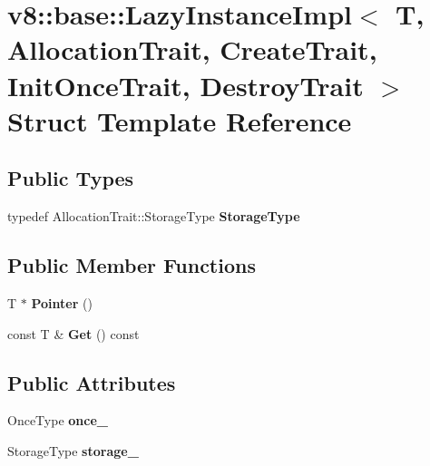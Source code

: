 \hypertarget{structv8_1_1base_1_1_lazy_instance_impl}{}\section{v8\+:\+:base\+:\+:Lazy\+Instance\+Impl$<$ T, Allocation\+Trait, Create\+Trait, Init\+Once\+Trait, Destroy\+Trait $>$ Struct Template Reference}
\label{structv8_1_1base_1_1_lazy_instance_impl}
\subsection*{Public Types}
\begin{DoxyCompactItemize}
\item 
typedef Allocation\+Trait\+::\+Storage\+Type {\bfseries Storage\+Type}\hypertarget{structv8_1_1base_1_1_lazy_instance_impl_a932ebac30855580c8ae22feb343b4b97}{}\label{structv8_1_1base_1_1_lazy_instance_impl_a932ebac30855580c8ae22feb343b4b97}

\end{DoxyCompactItemize}
\subsection*{Public Member Functions}
\begin{DoxyCompactItemize}
\item 
T $\ast$ {\bfseries Pointer} ()\hypertarget{structv8_1_1base_1_1_lazy_instance_impl_a731d414ae2f2f0fafb4df47502b21068}{}\label{structv8_1_1base_1_1_lazy_instance_impl_a731d414ae2f2f0fafb4df47502b21068}

\item 
const T \& {\bfseries Get} () const \hypertarget{structv8_1_1base_1_1_lazy_instance_impl_a18c32c8d47cfc7014b0bbbe8192f23f1}{}\label{structv8_1_1base_1_1_lazy_instance_impl_a18c32c8d47cfc7014b0bbbe8192f23f1}

\end{DoxyCompactItemize}
\subsection*{Public Attributes}
\begin{DoxyCompactItemize}
\item 
Once\+Type {\bfseries once\+\_\+}\hypertarget{structv8_1_1base_1_1_lazy_instance_impl_afb03ba68ffaf3610be2c2f021cc5faf5}{}\label{structv8_1_1base_1_1_lazy_instance_impl_afb03ba68ffaf3610be2c2f021cc5faf5}

\item 
Storage\+Type {\bfseries storage\+\_\+}\hypertarget{structv8_1_1base_1_1_lazy_instance_impl_a0fb34dedfa24df4e163436cd46d4faa7}{}\label{structv8_1_1base_1_1_lazy_instance_impl_a0fb34dedfa24df4e163436cd46d4faa7}

\end{DoxyCompactItemize}
